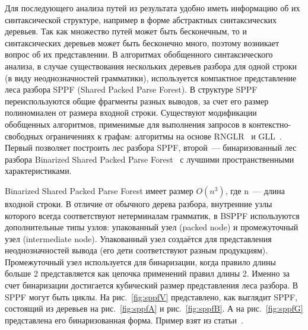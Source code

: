 Для последующего анализа путей из результата удобно иметь информацию об их синтаксической структуре, например в форме абстрактных синтаксических деревьев. Так как множество путей может быть бесконечным, то и синтаксических деревьев может быть бесконечно много, поэтому возникает вопрос об их представлении. В алгоритмах обобщенного синтаксического анализа, в случае существования нескольких деревьев разбора для одной строки (в виду неоднозначностей грамматики), используется компактное представление леса разбора SPPF (Shared Packed Parse Forest). В структуре SPPF переиспользуются общие фрагменты разных выводов, за счет его размер полиномиален от размера входной строки. Существуют модификации обобщенных алгоритмов, применимые для выполнения запросов в контекстно-свободных ограничениях к графам: алгоритмы на основе RNGLR~\cite{RNGLR} и GLL~\cite{GrigRagCFPQuerying}. Первый позволяет построить лес разбора SPPF, второй~--- бинаризованный лес разбора Binarized Shared Packed Parse Forest~\cite{SPPF} с лучшими пространственными характеристиками. 

Binarized Shared Packed Parse Forest имеет размер $O(n^3)$, где n~--- длина входной строки. В отличие от обычного дерева разбора, внутренние узлы которого всегда соответствуют нетерминалам грамматик, в BSPPF используются дополнительные типы узлов: упакованный узел (packed node) и промежуточный узел (intermediate node). Упакованный узел создаётся для представления неоднозначностей вывода (его дети соответствуют разным продукциям). Промежуточный узел используется для бинаризации, когда правило длины больше 2 представляется как цепочка применений правил длины 2. Именно за счет бинаризации достигается кубический размер представления леса разбора. В SPPF могут быть циклы. На рис.~\ref{fig:sppfV} представлено, как выглядит SPPF, состоящий из деревьев на рис.~\ref{fig:sppfA} и рис.~\ref{fig:sppfB}. А на рис.~\ref{fig:sppfG} представлена его бинаризованная форма. Пример взят из статьи~\cite{IzmCombinator}.

